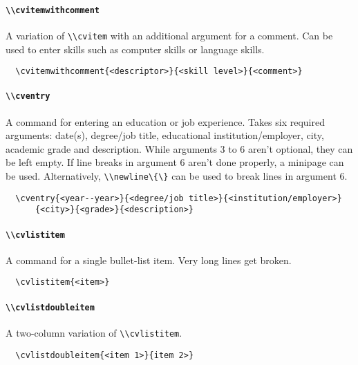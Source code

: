 \documentclass[a4paper, 11pt]{article}
\newcommand{\code}[1]{\lstinline!#1!}
\begin{document}
\paragraph{\code{\\cvitemwithcomment}}
A variation of \code{\\cvitem} with an additional argument for a comment.
Can be used to enter skills such as computer skills or language skills.
\begin{lstlisting}
  \cvitemwithcomment{<descriptor>}{<skill level>}{<comment>}
\end{lstlisting}

\paragraph{\code{\\cventry}}
A command for entering an education or job experience.
Takes six required arguments: date(s), degree/job title, educational institution/employer, city, academic grade and description.
While arguments 3 to 6 aren't optional, they can be left empty.
If line breaks in argument 6 aren't done properly, a minipage can be used.
Alternatively, \code{\\newline\{\}} can be used to break lines in argument 6.
\begin{lstlisting}
  \cventry{<year--year>}{<degree/job title>}{<institution/employer>}
      {<city>}{<grade>}{<description>}
\end{lstlisting}

\paragraph{\code{\\cvlistitem}}
A command for a single bullet-list item.
Very long lines get broken.
\begin{lstlisting}
  \cvlistitem{<item>}
\end{lstlisting}

\paragraph{\code{\\cvlistdoubleitem}}
A two-column variation of \code{\\cvlistitem}.
\begin{lstlisting}
  \cvlistdoubleitem{<item 1>}{item 2>}
\end{lstlisting}
\end{document}
